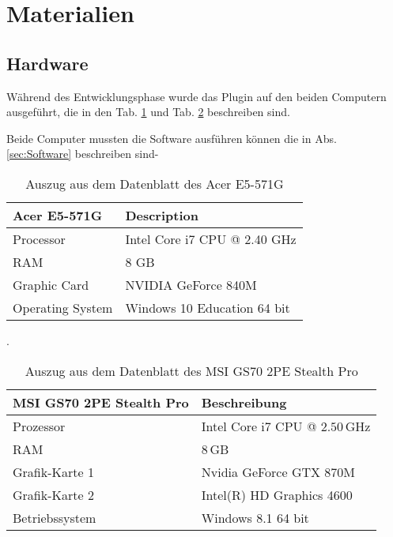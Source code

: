 
\section{Materialien}\label{sec:Materials}

\subsection{Hardware}\label{sec:Hardware}

Während des Entwicklungsphase wurde das Plugin auf den beiden Computern ausgeführt, die in den Tab. \ref{tab:Computer1} und Tab. \ref{tab:Computer2} beschreiben sind.

Beide Computer mussten die Software ausführen können die in Abs. \ref{sec:Software} beschreiben sind-

\begin{table}[H]
	\centering
	\begin{tabular}{|l|l|}
		\hline
		\Absatzbox{}
		\textbf{Acer E5-571G}& \textbf{Description} \\
		\hline
		Processor & Intel Core i7 CPU @ 2.40 GHz\\
		\hline
		RAM & 8 GB  \\
		\hline 
		Graphic Card & NVIDIA GeForce 840M\\
		\hline
		Operating System &  Windows 10 Education 64 bit   \\
		\hline
	\end{tabular}
	\caption[Auszug aus dem Datenblatt des Acer E5-571G]{Auszug aus dem Datenblatt des Acer E5-571G}.
	\label{tab:Computer1}
\end{table}

\begin{table}[H]
	\centering
	\begin{tabular}{|l|l|}
		\hline
		\Absatzbox{}
		\textbf{MSI GS70 2PE Stealth Pro}& \textbf{Beschreibung} \\
		\hline
		Prozessor & Intel Core i7 CPU @ $2.50\,$GHz \\
		\hline
		RAM & $8\,$GB \\
		\hline 
		Grafik-Karte 1 & Nvidia GeForce GTX 870M\\
		\hline
		Grafik-Karte 2 & Intel(R) HD Graphics 4600\\
		\hline
		Betriebssystem & Windows 8.1 64 bit \\
		\hline
	\end{tabular}
	\caption[Auszug aus dem Datenblatt des MSI GS70 2PE Stealth Pro]{Auszug aus dem Datenblatt des MSI GS70 2PE Stealth Pro}
	\label{tab:Computer2}
\end{table}

